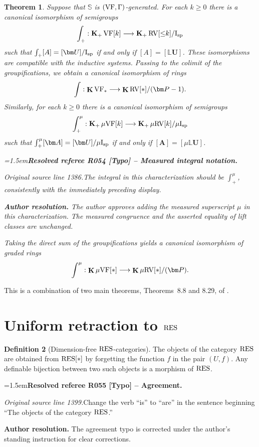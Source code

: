 \documentclass[12pt]{amsart}
\newcommand{\ResolvedRefereeRemark}[5]{%
  \par\medskip\begingroup\normalfont\small\color{gray}%
  \emergencystretch=1.5em\noindent\textbf{Resolved referee R#1 [#2] -- #3.}\par\nobreak\noindent #4\par
  \medskip\color{ResolutionGreen}\noindent\textbf{Author resolution.} #5\par
  \endgroup\medskip
}
\theoremstyle{plain}
\newtheorem{thm}{Theorem}[section]
\theoremstyle{definition}
\newtheorem{defn}[thm]{Definition}
\theoremstyle{remark}
\numberwithin{equation}{section}
\theoremstyle{plain}
\newcommand{\VF}{\textup{VF}}
\newcommand{\RV}{\textup{RV}}
\newcommand{\0}{\emptyset}
\newcommand{\bb}[1]{\mathbb{#1}}
\newcommand{\fun}{\longrightarrow}
\newcommand{\mgVF}{{\mu} {\VF}}
\newcommand{\mgRV}{{\mu}{\RV}}
\newcommand{\RES}{\textup{RES}}
\newcommand{\isp}{\textup{I}_{\textup{sp}}}
\newcommand{\mgisp}{\mu \isp}
\newcommand{\mgL}{{\mu}{\bb L}}
\DeclareMathOperator{\gsk}{\mathbf{K}_+}
\DeclareMathOperator{\ggk}{\mathbf{K}}
\begin{document}
\begin{thm}\label{main:prop:HK}
Suppose that $\mathbb{S}$ is $(\VF, \Gamma)$-generated. For each $k \geq 0$ there is a canonical isomorphism of semigroups
\[
\int_{+} : \gsk  \VF[k] \fun \gsk  \RV[{\leq}k] /  \isp
\]
such that $ \int_{+} [A] = [\bm U]/  \isp$ if and only if $[A] = [{\bb L}{\bm U}]$. These isomorphisms are  compatible with the inductive systems. Passing to  the colimit of the groupifications, we obtain a canonical isomorphism of rings
\[
\int : \ggk \VF_* \fun \ggk  \RV[*] /  (\bm P - 1).
\]
Similarly, for each $k \geq 0$ there is a canonical isomorphism of semigroups
\[
\int_{+}^\mu : \gsk  \mgVF[k] \fun \gsk  \mgRV[k] /  \mgisp
\]
such that $\int_{+}^{\mu} [\bm A] = [\bm U]/  \mgisp$  if and only if $[\bm A] = [{\mgL}{\bm U}]$.

\ResolvedRefereeRemark{054}{Typo}{Measured integral notation}{%
\textit{Original source line 1386.}\quad The integral in this characterization should be $\int_+^\mu$, consistently with the immediately preceding display.
}{The author approves adding the measured superscript $\mu$ in this characterization. The measured congruence and the asserted equality of lift classes are unchanged.}
Taking the direct sum of the groupifications yields a canonical isomorphism of graded rings
\[
\int^\mu : \ggk \mgVF[*] \fun \ggk  \mgRV[*] /  (\bm P).
\]
\end{thm}

This is a combination of two main theorems, Theorems~8.8 and 8.29, of \cite{hrushovski:kazhdan:integration:vf}.

\section{Uniform retraction to $\RES$}
\label{sec:retract}


\begin{defn}[Dimension-free $\RES$-categories]\label{df:res}
The objects of the category $\RES$ are obtained from $\RES[*]$ by forgetting the function $f$ in the pair $(U, f)$. Any definable bijection between two such objects is a morphism of $\RES$.

\ResolvedRefereeRemark{055}{Typo}{Agreement}{%
\textit{Original source line 1399.}\quad Change the verb ``is'' to ``are'' in the sentence beginning ``The objects of the category $\RES$.''
}{The agreement typo is corrected under the author's standing instruction for clear corrections.}
\end{defn}
\end{document}
